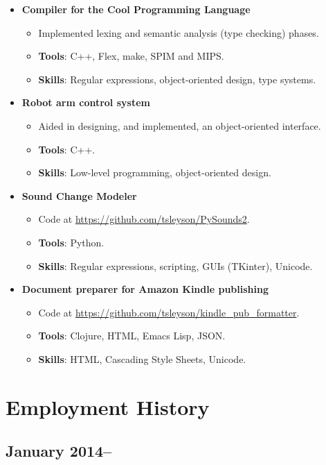 \documentclass[12pt]{article}
\begin{document}
\begin{itemize}
\item \textbf{Compiler for the Cool Programming Language}
\begin{itemize}
\item Implemented lexing and semantic analysis (type checking) phases.
\item \textbf{Tools}: C++, Flex, make, SPIM and MIPS.
\item \textbf{Skills}: Regular expressions, object-oriented design, type systems.
\end{itemize}
\item \textbf{Robot arm control system}
\begin{itemize}
\item Aided in designing, and implemented, an object-oriented interface.
\item \textbf{Tools}: C++.
\item \textbf{Skills}: Low-level programming, object-oriented design.
\end{itemize}
\item \textbf{Sound Change Modeler}
\begin{itemize}
\item Code at \href{https://github.com/tsleyson/PySounds2}{https://github.com/tsleyson/PySounds2}.
\item \textbf{Tools}: Python.
\item \textbf{Skills}: Regular expressions, scripting, GUIs (TKinter), Unicode.
\end{itemize}
\item \textbf{Document preparer for Amazon Kindle publishing}
\begin{itemize}
\item Code at \href{https://github.com/tsleyson/kindle_pub_formatter}{https://github.com/tsleyson/kindle\_pub\_formatter}.
\item \textbf{Tools}: Clojure, HTML, Emacs Lisp, JSON.
\item \textbf{Skills}: HTML, Cascading Style Sheets, Unicode.
\end{itemize}
\end{itemize}
\section*{Employment History}
\label{sec-5}
\subsection*{January 2014–}
\label{sec-5-1}
\end{document}
